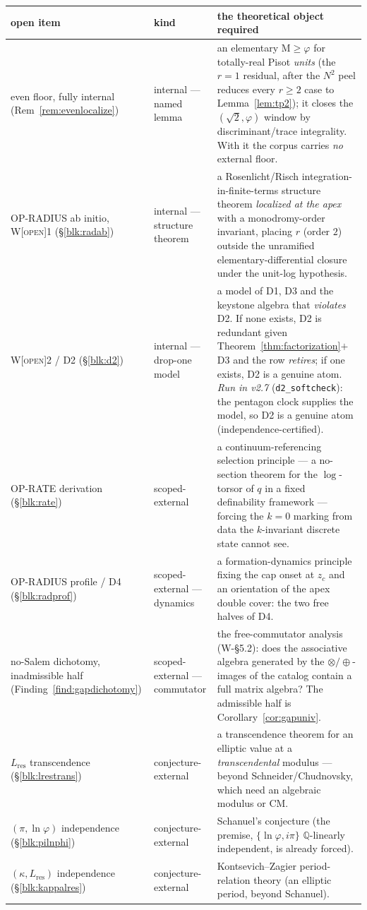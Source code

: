 \documentclass[11pt]{article}
\newcommand{\tagO}{\textcolor{cO}{\textsc{[open]}}}
\newcommand{\Q}{\mathbb{Q}}
\newcommand{\gp}{\varphi}
\newcommand{\M}{\mathrm{M}}
\theoremstyle{plain}
\theoremstyle{definition}
\theoremstyle{remark}
\begin{document}
\begin{center}\footnotesize\setlength{\tabcolsep}{4pt}
\begin{tabular}{@{}p{3.5cm}p{1.9cm}p{8.3cm}@{}}
\toprule
open item & kind & the theoretical object required\\
\midrule
even floor, fully internal (Rem~\ref{rem:evenlocalize}) & internal --- named lemma & an elementary $\M\ge\gp$ for totally-real Pisot \emph{units} (the $r=1$ residual, after the $N^2$ peel reduces every $r\ge2$ case to Lemma~\ref{lem:tp2}); it closes the $(\sqrt2,\gp)$ window by discriminant/trace integrality. With it the corpus carries \emph{no} external floor.\\[2pt]
OP-RADIUS ab initio, W\tagO{}1 (\S\ref{blk:radab}) & internal --- structure theorem & a Rosenlicht/Risch integration-in-finite-terms structure theorem \emph{localized at the apex} with a monodromy-order invariant, placing $r$ (order $2$) outside the unramified elementary-differential closure under the unit-log hypothesis.\\[2pt]
W\tagO{}2 / D2 (\S\ref{blk:d2}) & internal --- drop-one model & a model of D1, D3 and the keystone algebra that \emph{violates} D2. If none exists, D2 is redundant given Theorem~\ref{thm:factorization}$+$D3 and the row \emph{retires}; if one exists, D2 is a genuine atom. \emph{Run in v2.7} (\texttt{d2\_softcheck}): the pentagon clock supplies the model, so D2 is a genuine atom (independence-certified).\\[2pt]
OP-RATE derivation (\S\ref{blk:rate}) & scoped-external & a continuum-referencing selection principle --- a no-section theorem for the $\log$-torsor of $q$ in a fixed definability framework --- forcing the $k=0$ marking from data the $k$-invariant discrete state cannot see.\\[2pt]
OP-RADIUS profile / D4 (\S\ref{blk:radprof}) & scoped-external --- dynamics & a formation-dynamics principle fixing the cap onset at $z_c$ and an orientation of the apex double cover: the two free halves of D4.\\[2pt]
no-Salem dichotomy, inadmissible half (Finding~\ref{find:gapdichotomy}) & scoped-external --- commutator & the free-commutator analysis (W-\S5.2): does the associative algebra generated by the $\otimes/\oplus$-images of the catalog contain a full matrix algebra? The admissible half is Corollary~\ref{cor:gapuniv}.\\[2pt]
$L_{\mathrm{res}}$ transcendence (\S\ref{blk:lrestrans}) & conjecture-external & a transcendence theorem for an elliptic value at a \emph{transcendental} modulus --- beyond Schneider/Chudnovsky, which need an algebraic modulus or CM.\\[2pt]
$(\pi,\ln\gp)$ independence (\S\ref{blk:pilnphi}) & conjecture-external & Schanuel's conjecture (the premise, $\{\ln\gp,i\pi\}$ $\Q$-linearly independent, is already forced).\\[2pt]
$(\kappa,L_{\mathrm{res}})$ independence (\S\ref{blk:kappalres}) & conjecture-external & Kontsevich--Zagier period-relation theory (an elliptic period, beyond Schanuel).\\
\bottomrule
\end{tabular}
\end{center}
\end{document}
